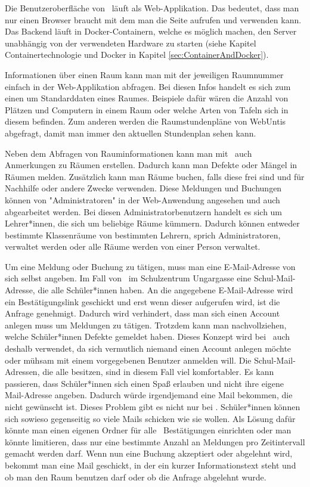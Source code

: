 Die Benutzeroberfläche von \ZELIA\ läuft als Web-Applikation. Das bedeutet, dass man nur einen Browser braucht mit dem man die Seite aufrufen und verwenden kann. Das Backend läuft in Docker-Containern, welche es möglich machen, den Server unabhängig von der verwendeten Hardware zu starten (siehe Kapitel Containertechnologie und Docker in Kapitel \ref{sec:ContainerAndDocker}).

Informationen über einen Raum kann man mit der jeweiligen Raumnummer einfach in der Web-Applikation abfragen. Bei diesen Infos handelt es sich zum einen um Standarddaten eines Raumes. Beispiele dafür wären die Anzahl von Plätzen und Computern in einem Raum oder welche Arten von Tafeln sich in diesem befinden. Zum anderen werden die Raumstundenpläne von WebUntis abgefragt, damit man immer den aktuellen Stundenplan sehen kann.

Neben dem Abfragen von Rauminformationen kann man mit \ZELIA\ auch Anmerkungen zu Räumen erstellen. Dadurch kann man Defekte oder Mängel in Räumen melden. Zusätzlich kann man Räume buchen, falls diese frei sind und für Nachhilfe oder andere Zwecke verwenden. Diese Meldungen und Buchungen können von "Administratoren" in der Web-Anwendung angesehen und auch abgearbeitet werden. Bei diesen Administratorbenutzern handelt es sich um Lehrer*innen, die sich um beliebige Räume kümmern. Dadurch können entweder bestimmte Klassenräume von bestimmten Lehrern, sprich Administratoren, verwaltet werden oder alle Räume werden von einer Person verwaltet.

Um eine Meldung oder Buchung zu tätigen, muss man eine E-Mail-Adresse von sich selbst angeben. Im Fall von \ZELIA\ im Schulzentrum Ungargasse eine Schul-Mail-Adresse, die alle Schüler*innen haben. An die angegebene E-Mail-Adresse wird ein Bestätigungslink geschickt und erst wenn dieser aufgerufen wird, ist die Anfrage genehmigt. Dadurch wird verhindert, dass man sich einen Account anlegen muss um Meldungen zu tätigen. Trotzdem kann man nachvollziehen, welche Schüler*innen Defekte gemeldet haben. Dieses Konzept wird bei \ZELIA\ auch deshalb verwendet, da sich vermutlich niemand einen Account anlegen möchte oder mühsam mit einem vorgegebenen Benutzer anmelden will. Die Schul-Mail-Adressen, die alle besitzen, sind in diesem Fall viel komfortabler. Es kann passieren, dass Schüler*innen sich einen Spaß erlauben und nicht ihre eigene Mail-Adresse angeben. Dadurch würde irgendjemand eine Mail bekommen, die nicht gewünscht ist. Dieses Problem gibt es nicht nur bei \ZELIA. Schüler*innen können sich sowieso gegenseitig so viele Mails schicken wie sie wollen. Als Lösung dafür könnte man einen eigenen Ordner für alle \ZELIA\ Bestätigungen einrichten oder man könnte limitieren, dass nur eine bestimmte Anzahl an Meldungen pro Zeitintervall gemacht werden darf. Wenn nun eine Buchung akzeptiert oder abgelehnt wird, bekommt man eine Mail geschickt, in der ein kurzer Informationstext steht und ob man den Raum benutzen darf oder ob die Anfrage abgelehnt wurde.

